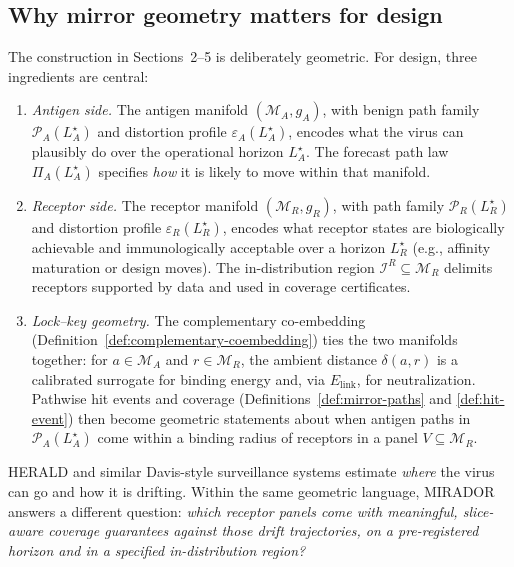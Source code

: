 \documentclass[11pt]{article}
\begin{document}
\subsection{Why mirror geometry matters for design}

The construction in Sections~2--5 is deliberately geometric. For design, three ingredients are
central:

\begin{enumerate}
  \item \emph{Antigen side.}
  The antigen manifold $(\mathcal{M}_A, g_A)$, with benign path family
  $\mathcal{P}_A(L_A^\star)$ and distortion profile $\varepsilon_A(L_A^\star)$, encodes what the
  virus can plausibly do over the operational horizon $L_A^\star$. The forecast path law
  $\Pi_A(L_A^\star)$ specifies \emph{how} it is likely to move within that manifold.

  \item \emph{Receptor side.}
  The receptor manifold $(\mathcal{M}_R, g_R)$, with path family $\mathcal{P}_R(L_R^\star)$ and
  distortion profile $\varepsilon_R(L_R^\star)$, encodes what receptor states are biologically
  achievable and immunologically acceptable over a horizon $L_R^\star$ (e.g., affinity
  maturation or design moves). The in-distribution region $\mathcal{I}^R \subseteq \mathcal{M}_R$
  delimits receptors supported by data and used in coverage certificates.

  \item \emph{Lock--key geometry.}
  The complementary co-embedding (Definition~\ref{def:complementary-coembedding}) ties the two
  manifolds together: for $a \in \mathcal{M}_A$ and $r \in \mathcal{M}_R$, the ambient distance
  $\delta(a,r)$ is a calibrated surrogate for binding energy and, via $E_{\text{link}}$, for
  neutralization. Pathwise hit events and coverage (Definitions~\ref{def:mirror-paths} and
  \ref{def:hit-event}) then become geometric statements about when antigen paths in
  $\mathcal{P}_A(L_A^\star)$ come within a binding radius of receptors in a panel $V \subseteq
  \mathcal{M}_R$.
\end{enumerate}

HERALD and similar Davis-style surveillance systems estimate \emph{where} the virus can go and how
it is drifting. Within the same geometric language, MIRADOR answers a different question:
\emph{which receptor panels come with meaningful, slice-aware coverage guarantees against those
drift trajectories, on a pre-registered horizon and in a specified in-distribution region?}
\end{document}
